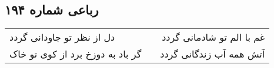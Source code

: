 \begin{center}
\section*{رباعی شماره ۱۹۴}
\label{sec:sh194}
\begin{longtable}{l p{0.5cm} r}
دل از نظر تو جاودانی گردد
&&
غم با الم تو شادمانی گردد
\\
گر باد به دوزخ برد از کوی تو خاک
&&
آتش همه آب زندگانی گردد
\\
\end{longtable}
\end{center}
